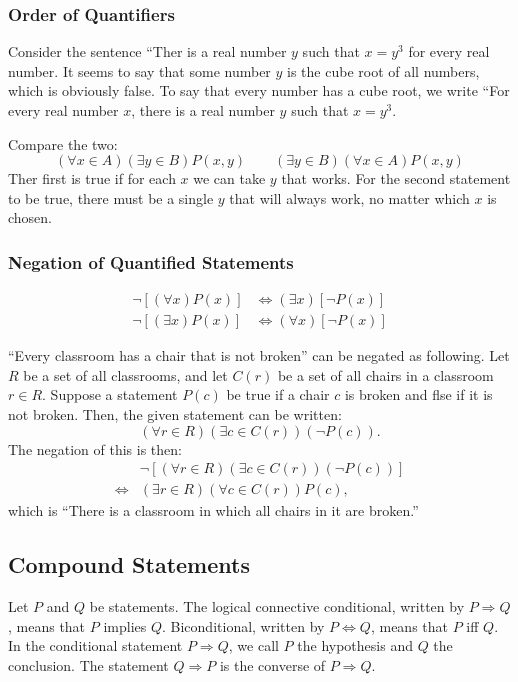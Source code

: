 \documentclass[../main.tex]{subfiles}
\begin{document}
\subsubsection{Order of Quantifiers}
Consider the sentence ``Ther is a real number $y$ such that $x = y^3$ for every real number.
It seems to say that some number $y$ is the cube root of all numbers, which is obviously false.
To say that every number has a cube root, we write ``For every real number $x$, there is a real number $y$ such that $x = y^3$.

Compare the two:
\[
    (\forall x \in A)(\exists y \in B) P(x, y) \qquad (\exists y \in B)(\forall x \in A) P(x, y)
\]
Ther first is true if for each $x$ we can take $y$ that works.
For the second statement to be true, there must be a single $y$ that will always work, no matter which $x$ is chosen.

\subsubsection{Negation of Quantified Statements}
\begin{align*}
    \neg [(\forall x) P(x)] &\Leftrightarrow (\exists x)[\neg P(x)]\\
    \neg [(\exists x) P(x)] &\Leftrightarrow (\forall x)[\neg P(x)]
\end{align*}

\begin{ex}
    ``Every classroom has a chair that is not broken'' can be negated as following.
    Let $R$ be a set of all classrooms, and let $C(r)$ be a set of all chairs in a classroom $r \in R$.
    Suppose a statement $P(c)$ be true if a chair $c$ is broken and flse if it is not broken.
    Then, the given statement can be written:
    \[
        (\forall r \in R)(\exists c \in C(r))(\neg P(c)).
    \]
    The negation of this is then:
    \begin{align*}
        &\neg [(\forall r \in R)(\exists c \in C(r))(\neg P(c))]\\
        \Leftrightarrow & (\exists r \in R)(\forall c \in C(r)) P(c),
    \end{align*}
    which is ``There is a classroom in which all chairs in it are broken.''
\end{ex}

\subsection{Compound Statements}
\begin{defn}
    Let $P$ and $Q$ be statements.
    The logical connective \textsf{conditional}, written by $P \Rightarrow Q$, means that $P$ implies $Q$.
    \textsf{Biconditional}, written by $P \Leftrightarrow Q$, means that $P$ iff $Q$.
    In the conditional statement $P \Rightarrow Q$, we call $P$ the \textsf{hypothesis} and $Q$ the \textsf{conclusion}.
    The statement $Q \Rightarrow P$ is the \textsf{converse} of $P \Rightarrow Q$.
\end{defn}
\end{document}
